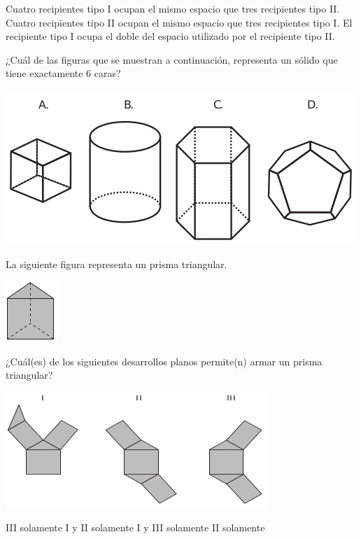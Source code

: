 \documentclass[10pt,letterpaper,addpoints]{exam}
\begin{document}
\begin{multicols}{2}
\begin{questions}
\begin{choices}
 \choice Cuatro recipientes tipo I ocupan el mismo espacio que tres recipientes tipo II.
 \choice Cuatro recipientes tipo II ocupan el mismo espacio que tres recipientes tipo I.
 \CorrectChoice El recipiente tipo I ocupa el doble del espacio utilizado por el recipiente tipo II.
 \end{choices}
 \question ¿Cuál de las figuras que se muestran a continuación, representa un sólido que tiene exactamente 6 caras?
 \begin{center}
 \includegraphics[scale=.45]{Images/Pantallazo-8.png} 
 \end{center}
 \question La siguiente figura representa un prisma triangular.
 \begin{center}
 \includegraphics[scale=.75]{Images/Pantallazo-9.png} 
 \end{center}
 ¿Cuál(es) de los siguientes desarrollos planos permite(n) armar un prisma triangular?
 \begin{center}
 \includegraphics[scale=.65]{Images/Pantallazo-10.png} 
 \end{center}
 \begin{choices}
 \choice III solamente
 \CorrectChoice I y II solamente
 \choice I y III solamente
  \choice II solamente
 \end{choices}
 \end{questions}
\end{multicols}
\end{document}
